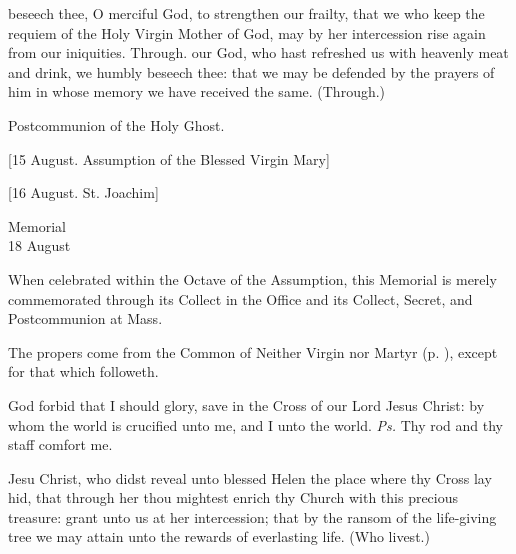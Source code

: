 
\postcommunion
{} beseech thee, O merciful God, to strengthen our frailty, that we who keep the requiem of the Holy Virgin Mother of God, may by her intercession rise again from our iniquities. Through.
 our God, who hast refreshed us with heavenly meat and drink, we humbly beseech thee: that we may be defended by the prayers of him in whose memory we have received the same. (Through.)
\begin{rubric}
	 Postcommunion of the Holy Ghost.
\end{rubric}

\begin{center}
	[15 August. Assumption of the Blessed Virgin Mary]
\end{center}

\begin{center}
	[16 August. St. Joachim]
\end{center}

\begin{inhead}
    {Memorial\\
18 August}
\end{inhead}

\begin{rubric}
	When celebrated within the Octave of the Assumption, this Memorial is merely commemorated through its Collect in the Office and its Collect, Secret, and Postcommunion at Mass.
\end{rubric}
\begin{rubric}
	The propers come from the Common of Neither Virgin nor Martyr (p. \pageref{CommonNeitherVirginMartyr}), except for that which followeth.
\end{rubric}

\introit
{} God forbid that I should glory, save in the Cross of our Lord Jesus Christ: by whom the world is crucified unto me, and I unto the world. \textit{Ps.} Thy rod and thy staff comfort me.

\collect
{} Jesu Christ, who didst reveal unto blessed Helen the place where thy Cross lay hid, that through her thou mightest enrich thy Church with this precious treasure: grant unto us at her intercession; that by the ransom of the life-giving tree we may attain unto the rewards of everlasting life. (Who livest.)

